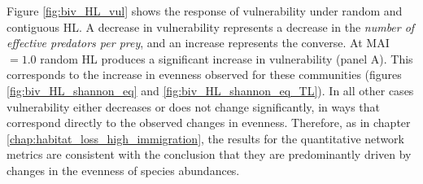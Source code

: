 Figure \ref{fig:biv_HL_vul} shows the response of vulnerability under random and contiguous HL. A decrease in vulnerability represents a decrease in the \emph{number of effective predators per prey}, and an increase represents the converse. At MAI$=1.0$ random HL produces a significant increase in vulnerability (panel A). This corresponds to the increase in evenness observed for these communities (figures \ref{fig:biv_HL_shannon_eq} and \ref{fig:biv_HL_shannon_eq_TL}). In all other cases vulnerability either decreases or does not change significantly, in ways that correspond directly to the observed changes in evenness. Therefore, as in chapter \ref{chap:habitat_loss_high_immigration}, the results for the quantitative network metrics are consistent with the conclusion that they are predominantly driven by changes in the evenness of species abundances. 
 
